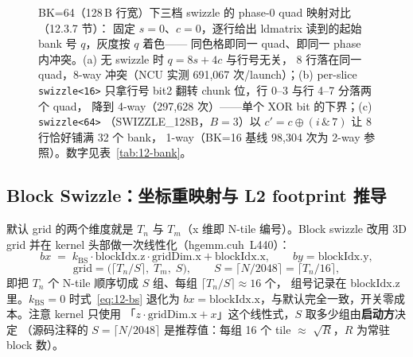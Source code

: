 \begin{figure}[H]
\caption{BK=64（128\,B 行宽）下三档 swizzle 的 phase-0 quad 映射对比（12.3.7 节）：
固定 $s{=}0$、$c{=}0$，逐行给出 ldmatrix 读到的起始 bank 号 $q$，灰度按 $q$ 着色——
同色格即同一 quad、即同一 phase 内冲突。(a) 无 swizzle 时 $q=8s+4c$ 与行号无关，
8 行落在同一 quad，8-way 冲突（NCU 实测 691{,}067 次/launch）；(b) per-slice
\texttt{swizzle<16>} 只拿行号 bit2 翻转 chunk 位，行 0--3 与行 4--7 分落两个 quad，
降到 4-way（297{,}628 次）——单个 XOR bit 的下界；(c) \texttt{swizzle<64>}
（SWIZZLE\_128B，$B{=}3$）以 $c'=c\oplus(i\,\&\,7)$ 让 8 行恰好铺满 32 个 bank，
1-way（BK=16 基线 98{,}304 次为 2-way 参照）。数字见表~\ref{tab:12-bank}。}
\label{fig:12-quad-swizzle}
\end{figure}

\subsection{Block Swizzle：坐标重映射与 L2 footprint 推导}

默认 grid 的两个维度就是 $T_n$ 与 $T_m$（x 维即 N-tile 编号）。Block swizzle 改用
3D grid 并在 kernel 头部做一次线性化（hgemm.cuh~L440）：
\begin{equation}
  bx \;=\; k_{\mathrm{BS}}\cdot \mathrm{blockIdx.z}\cdot \mathrm{gridDim.x}
         + \mathrm{blockIdx.x}, \qquad by=\mathrm{blockIdx.y},
  \label{eq:12-bs}
\end{equation}
\begin{equation}
  \mathrm{grid} = \bigl(\lceil T_n/S\rceil,\; T_m,\; S\bigr),\qquad
  S=\lceil N/2048\rceil=\lceil T_n/16\rceil ,
\end{equation}
即把 $T_n$ 个 N-tile 顺序切成 $S$ 组、每组 $\lceil T_n/S\rceil\approx16$ 个，
组号记录在 blockIdx.z 里。$k_{\mathrm{BS}}{=}0$ 时式~\ref{eq:12-bs} 退化为
$bx=\mathrm{blockIdx.x}$，与默认完全一致，开关零成本。注意 kernel 只使用
「$z\cdot\mathrm{gridDim.x}+x$」这个线性式，$S$ 取多少组由\textbf{启动方}决定
（源码注释的 $S{=}\lceil N/2048\rceil$ 是推荐值：每组 16 个 tile $\approx$
$\sqrt{R}$，$R$ 为常驻 block 数）。

